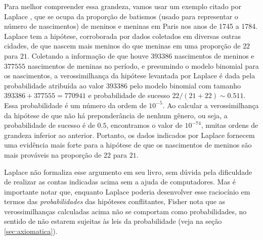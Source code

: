 Para melhor compreender essa grandeza, vamos usar um exemplo citado por Laplace \citep{Laplace1814}, que se ocupa da 
proporção de batismos (usado para representar o número de nascimentos) de meninos e meninas em Paris nos anos 
de 1745 a 1784. Laplace tem a hipótese, corroborada por dados coletados em diversas outras cidades, de que nascem mais meninos
do que meninas em uma proporção de $22$ para $21$. Coletando a
informação de que houve $393386$ nascimentos de meninos e $377555$
nascimentos de meninas no período, e presumindo o modelo binomial para os nascimentos, a verossimilhança da hipótese levantada
por Laplace é dada pela probabilidade atribuída ao valor $393386$ pelo modelo binomial com tamanho $393386 + 377555 = 770941$
e probabilidade de sucesso $22/(21+22) \sim 0.511$. Essa probabilidade é um número da ordem de $10^{-5}$. Ao calcular a 
verossimilhança da hipótese de que não há preponderância de nenhum gênero, ou seja, a probabilidade de sucesso é de $0.5$, 
encontramos o valor de $10^{-74}$, muitas ordens de grandeza inferior ao anterior. Portanto, os dados indicados por Laplace
fornecem uma evidência mais forte para a hipótese de que os nascimentos de meninos são mais prováveis na proporção de $22$
para $21$. %

Laplace não formaliza esse argumento em seu livro, sem dúvida pela dificuldade de realizar as contas indicadas acima sem
a ajuda de computadores. Mas é importante notar que, enquanto Laplace poderia desenvolver esse raciocínio em termos das 
{\em probabilidades} das hipóteses conflitantes, Fisher nota que as verossimilhanças calculadas acima não se comportam como 
probabilidades, no sentido de não estarem sujeitas às leis da
probabilidade (veja na seção \ref{sec:axiomatica}).


